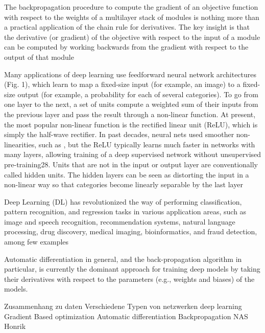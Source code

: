 The backpropagation procedure to compute the gradient of an objective function with respect to the weights of a multilayer stack of modules is nothing more than a practical application of the chain rule for derivatives. The key insight is that the derivative (or gradient) of the objective with respect to the input of a module can be computed by working backwards from the gradient with respect to the output of that module

Many applications of deep learning use feedforward neural network architectures (Fig. 1), which learn to map a fixed-size input (for example, an image) to a fixed-size output (for example, a probability for each of several categories). To go from one layer to the next, a set of units compute a weighted sum of their inputs from the previous layer and pass the result through a non-linear function. At present, the most popular non-linear function is the rectified linear unit (ReLU), which is simply the half-wave rectifier. In past decades, neural nets used smoother non-linearities, such as , but the ReLU typically learns much faster in networks with many layers, allowing training of a deep supervised network without unsupervised pre-training28. Units that are not in the input or output layer are conventionally called hidden units. The hidden layers can be seen as distorting the input in a non-linear way so that categories become linearly separable by the last layer 

Deep Learning (DL) has revolutionized the way of performing classification, pattern recognition, and regression
tasks in various application areas, such as image and speech recognition, recommendation systems, natural language
processing, drug discovery, medical imaging, bioinformatics, and fraud detection, among few examples

Automatic differentiation in general, and the back-propagation algorithm in particular, is currently the dominant approach for training deep models by taking their derivatives with respect to the parameters (e.g., weights and biases) of the models.


Zusammenhang zu daten
Verschiedene Typen von netzwerken
deep learning
Gradient Based optimization
Automatic differentiation
Backpropagation 
NAS
Honrik 